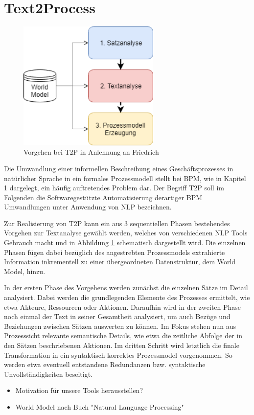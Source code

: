\section{Text2Process}
\begin{figure}
\includegraphics[width=7cm]{pictures/T2P_highlevel.png}
\caption{Vorgehen bei T2P in Anlehnung an Friedrich}
\label{fig:T2PHL}
\end{figure}
Die Umwandlung einer informellen Beschreibung eines Geschäftsprozesses in natürlicher Sprache in ein formales Prozessmodell stellt bei \ac{BPM}, wie in Kapitel 1 dargelegt, ein häufig auftretendes Problem dar. 
Der Begriff \ac{T2P} soll im Folgenden die Softwaregestützte Automatisierung derartiger \ac{BPM} Umwandlungen unter Anwendung von \ac{NLP} bezeichnen.\par
Zur Realisierung von \ac{T2P} kann ein aus 3 sequentiellen Phasen bestehendes Vorgehen zur Textanalyse gewählt werden, welches von verschiedenen \ac{NLP} Tools Gebrauch macht und in Abbildung \ref{fig:T2PHL} schematisch dargestellt wird. Die einzelnen Phasen fügen dabei bezüglich des angestrebten Prozessmodels extrahierte Information inkrementell zu einer übergeordneten Datenstruktur, dem World Model, hinzu.\par
In der ersten Phase des Vorgehens werden zunächst die einzelnen Sätze im Detail analysiert. Dabei werden die grundlegenden Elemente des Prozesses ermittelt, wie etwa Akteure, Ressourcen oder Aktionen. Daraufhin wird in der zweiten Phase noch einmal der Text in seiner Gesamtheit analysiert, um auch Bezüge und Beziehungen zwischen Sätzen auswerten zu können. Im Fokus stehen nun aus Prozesssicht relevante semantische Details, wie etwa die zeitliche Abfolge der in den Sätzen beschriebenen Aktionen. Im dritten Schritt wird letztlich die finale Transformation in ein syntaktisch korrektes Prozessmodel vorgenommen. So werden etwa  eventuell entstandene Redundanzen bzw. syntaktische Unvollständigkeiten beseitigt. 


\begin{itemize} 
\item Motivation für unsere Tools herausstellen? 
\item World Model nach Buch "Natural Language Processing"
\end{itemize}
